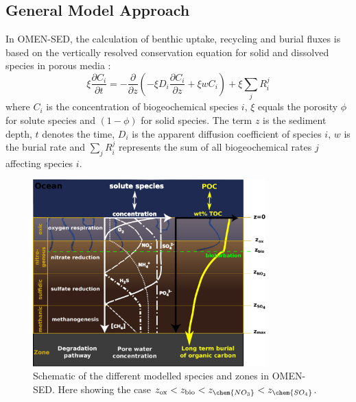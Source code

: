 \documentclass[gmd, manuscript]{copernicus}
\begin{document}
\subsection {General Model Approach} \label{subsec:GeneralModelApproach}
In OMEN-SED, the calculation of benthic uptake, recycling and burial fluxes is based on the vertically resolved conservation equation for solid and dissolved species in porous media 
\citep[e.g.][]{berner_early_1980, boudreau1997diagenetic}:
\begin{equation} 
\xi \frac{\partial C_i}{\partial t}=-\frac{\partial}{\partial z}\left( -\xi D_i \frac{\partial C_i}{\partial z} +\xi w C_i\right)    +\xi \sum_j R_i^j \label{eq:Eq_generaldiagenetic}
\end{equation}
where $C_i$ is the concentration of biogeochemical species $i$, $\xi$ equals the porosity $\phi$ for solute species and $(1-\phi)$ for solid species. The term $z$ is the sediment depth, $t$ denotes the time, 
$D_i$ is the apparent diffusion coefficient of species $i$, $w$ is the burial rate  and $\sum_j R_i^j$ represents the sum of all biogeochemical rates $j$ affecting species $i$. 

\begin{figure}[htbp]
\begin{center}
	\includegraphics[width=0.8\textwidth]{figures/Sediment-model-with-profiles.pdf}
	\caption{Schematic of the different modelled species and zones in OMEN-SED. Here showing the case $z_{\mathrm{ox}} < z_{\mathrm{bio}} < z_{\chem{NO_3}} < z_{\chem{SO_4}}$.}
	\label{fig:Sediment_layers}
	\end{center}
\end{figure}
\end{document}
